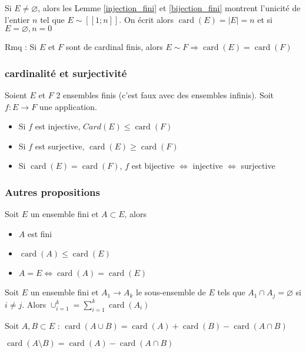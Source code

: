 \documentclass[french]{yLectureNote}
\DeclareMathOperator{\card}{card}
\begin{document}
Si $E\neq \varnothing$, alors les Lemme \ref{injection_fini} et \ref{bijection_fini} montrent l'unicité de l'entier $n$ tel que $E\sim [\![1;n]\!]$. On écrit alors $\card(E) = |E| = n$ et si $E=\varnothing, n=0$

Rmq : Si $E$ et $F$ sont de cardinal finis, alors $E\sim F \Rightarrow \card(E) = \card(F)$
\subsubsection{cardinalité et surjectivité}
Soient $E$ et $F$ 2 ensembles finis (c'est faux avec des ensembles infinis). Soit $f:E\to F$ une application.
\begin{itemize}
 \item Si $f$ est injective, $Card(E)\leq \card(F)$
  \item Si $f$ est surjective, $\card(E)\geq \card(F)$
    \item Si $\card(E) = \card(F)$, $f$ est bijective $\iff$ injective $\iff$ surjective
\end{itemize}

\subsubsection{Autres propositions}

Soit $E$ un ensemble fini et $A\subset E$, alors
\begin{itemize}
 \item $A$ est fini
 \item $\card(A) \leq \card(E)$
 \item $A=E \iff \card(A) = \card(E)$
\end{itemize}

Soit $E$ un ensemble fini et $A_1\to A_k$ le sous-ensemble de $E$ tels que $A_1\cap A_j = \varnothing$ si $i\neq j$. Alors $\cup^k_{i=1} = \sum^k_{i=1} \card(A_i)$

Soit $A,B \subset E$ : $\card(A\cup B) = \card(A) + \card(B) - \card(A\cap B)$

$\card(A\setminus B) = \card(A) - \card(A\cap B)$
\end{document}
